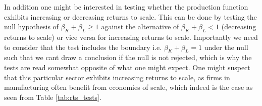 

In addition one might be interested in testing whether the production function exhibits increasing or decreasing returns to scale. This can be done by testing the null hypothesis of $\beta_K + \beta_L \geq 1$ against the alternative of $\beta_K + \beta_L < 1$ (decreasing returns to scale) or vice versa for increasing returns to scale. Importantly we need to consider that the test includes the boundary i.e. $\beta_K + \beta_L = 1$ under the null such that we cant draw a conclusion if the null is not rejected, which is why the tests are read somewhat opposite of what one might expect. One might suspect that this particular sector exhibits increasing returns to scale, as firms in manufacturing often benefit from economies of scale, which indeed is the case as seen from Table \ref{tab:rts_tests}.


